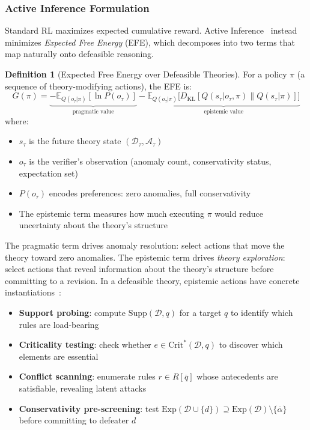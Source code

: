 \documentclass{article}
\theoremstyle{definition}
\newtheorem{definition}[theorem]{Definition}
\newcommand{\D}{\mathcal{D}}
\newcommand{\Supp}{\mathrm{Supp}}
\newcommand{\CritStar}{\mathrm{Crit}^{*}}
\newcommand{\Exp}{\mathrm{Exp}}
\newcommand{\comp}[1]{\overline{#1}}
\begin{document}
\subsubsection{Active Inference Formulation}

Standard RL maximizes expected cumulative reward. Active Inference~\cite{parr2022active} instead minimizes \emph{Expected Free Energy} (EFE), which decomposes into two terms that map naturally onto defeasible reasoning.

\begin{definition}[Expected Free Energy over Defeasible Theories]\label{def:efe}
For a policy $\pi$ (a sequence of theory-modifying actions), the EFE is:
\[
    G(\pi) = \underbrace{-\mathbb{E}_{Q(o_\tau|\pi)}[\ln P(o_\tau)]}_{\text{pragmatic value}} - \underbrace{\mathbb{E}_{Q(o_\tau|\pi)}\bigl[D_{\mathrm{KL}}[Q(s_\tau|o_\tau,\pi) \| Q(s_\tau|\pi)]\bigr]}_{\text{epistemic value}}
\]
where:
\begin{itemize}[nosep]
    \item $s_\tau$ is the future theory state $(\D_\tau, \mathcal{A}_\tau)$
    \item $o_\tau$ is the verifier's observation (anomaly count, conservativity status, expectation set)
    \item $P(o_\tau)$ encodes preferences: zero anomalies, full conservativity
    \item The epistemic term measures how much executing $\pi$ would reduce uncertainty about the theory's structure
\end{itemize}
\end{definition}

The pragmatic term drives anomaly resolution: select actions that move the theory toward zero anomalies. The epistemic term drives \emph{theory exploration}: select actions that reveal information about the theory's structure before committing to a revision. In a defeasible theory, epistemic actions have concrete instantiations~\cite{friston2017active,sajid2021active}:

\begin{itemize}[nosep]
    \item \textbf{Support probing}: compute $\Supp(\D, q)$ for a target $q$ to identify which rules are load-bearing
    \item \textbf{Criticality testing}: check whether $e \in \CritStar(\D, q)$ to discover which elements are essential
    \item \textbf{Conflict scanning}: enumerate rules $r \in R[\comp{q}]$ whose antecedents are satisfiable, revealing latent attacks
    \item \textbf{Conservativity pre-screening}: test $\Exp(\D \cup \{d\}) \supseteq \Exp(\D) \setminus \{\comp{\alpha}\}$ before committing to defeater $d$
\end{itemize}
\end{document}
